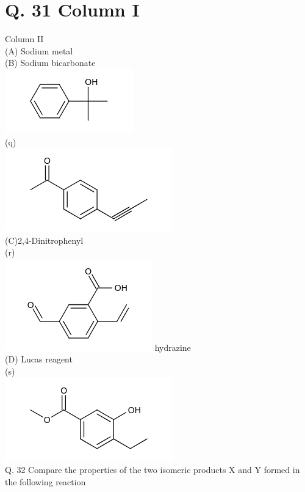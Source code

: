 \documentclass[10pt]{article}
\begin{document}
\section*{Q. 31 Column I}
Column II\\
(A) Sodium metal\\
(B) Sodium bicarbonate\\
\includegraphics{smile-eda42037ad4bbdd978eb64d3f6b3b20a1cc38c8f}\\
(q)\\
\includegraphics{smile-fbee25cb0fb642b21a661b47e29d632ca7f94c4c}\\
(C)2,4-Dinitrophenyl\\
(r)\\
\includegraphics{smile-cf87b93f2f03679b129a5e74d791eee6c8b5add0} hydrazine\\
(D) Lucas reagent\\
(s)\\
\includegraphics{smile-992520bcfde400de16436145316c4a204f109a2b}\\
Q. 32 Compare the properties of the two isomeric products X and Y formed in the following reaction\\
\end{document}
